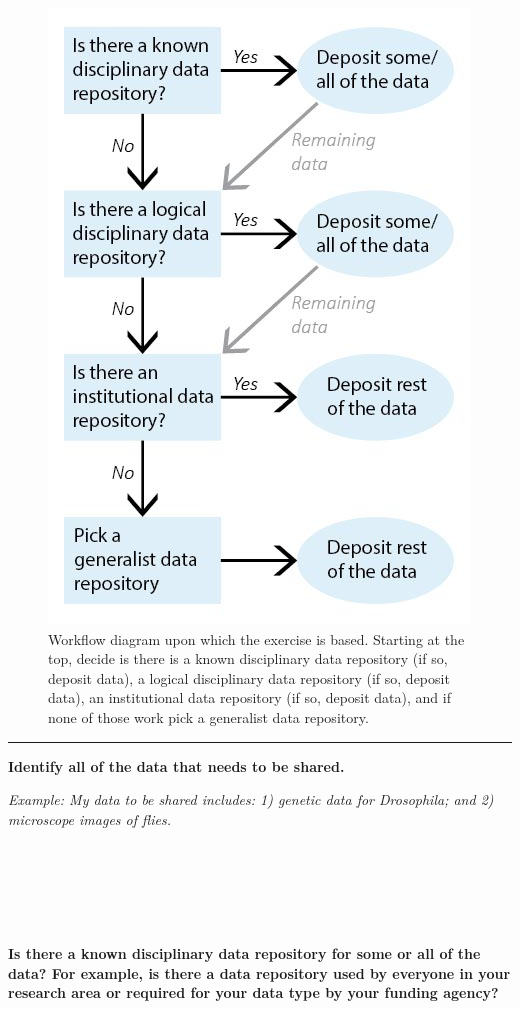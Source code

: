 \documentclass[
]{book}
\begin{document}
\begin{figure}
\centering
\includegraphics{images/06_Repository.jpg}
\caption{Workflow diagram upon which the exercise is based. Starting at the top, decide is there is a known disciplinary data repository (if so, deposit data), a logical disciplinary data repository (if so, deposit data), an institutional data repository (if so, deposit data), and if none of those work pick a generalist data repository.}
\end{figure}

\begin{center}\rule{0.5\linewidth}{0.5pt}\end{center}

\textbf{Identify all of the data that needs to be shared.}

\emph{Example: My data to be shared includes: 1) genetic data for Drosophila; and 2) microscope images of flies.}

~

~

~

\textbf{Is there a known disciplinary data repository for some or all of the data? For example, is there a data repository used by everyone in your research area or required for your data type by your funding agency?}
\end{document}
